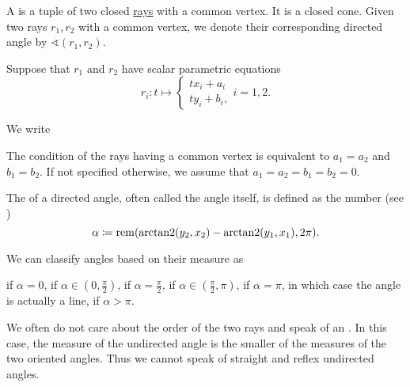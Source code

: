 \begin{definition}\label{def:angle}
  A  is a tuple of two closed \hyperref[def:geometric_ray]{rays} with a common vertex. It is a closed cone. Given two rays \( r_1, r_2 \) with a common vertex, we denote their corresponding directed angle by \( \sphericalangle(r_1, r_2) \).

  Suppose that \( r_1 \) and \( r_2 \) have scalar parametric equations
  \begin{equation*}
    r_i: t \mapsto
    \begin{cases}
      tx_i + a_i \\
      ty_i + b_i,
    \end{cases}
    i = 1, 2.
  \end{equation*}

  We write

  The condition of the rays having a common vertex is equivalent to \( a_1 = a_2 \) and \( b_1 = b_2 \). If not specified otherwise, we assume that \( a_1 = a_2 = b_1 = b_2 = 0 \).

  The  of a directed angle, often called the angle itself, is defined as the number (see )
  \begin{equation*}
    \alpha \coloneqq \operatorname{rem}(\operatorname{arctan2}(y_2, x_2) - \operatorname{arctan2}(y_1, x_1), 2\pi).
  \end{equation*}

  We can classify angles based on their measure as
  \begin{thmenum}
      if \( \alpha = 0 \),
      if \( \alpha \in (0, \tfrac \pi 2) \),
      if \( \alpha = \tfrac \pi 2 \),
      if \( \alpha \in (\tfrac \pi 2, \pi) \),
      if \( \alpha = \pi \), in which case the angle is actually a line,
      if \( \alpha > \pi \).
  \end{thmenum}

  We often do not care about the order of the two rays and speak of an . In this case, the measure of the undirected angle is the smaller of the measures of the two oriented angles. Thus we cannot speak of straight and reflex undirected angles.
\end{definition}

